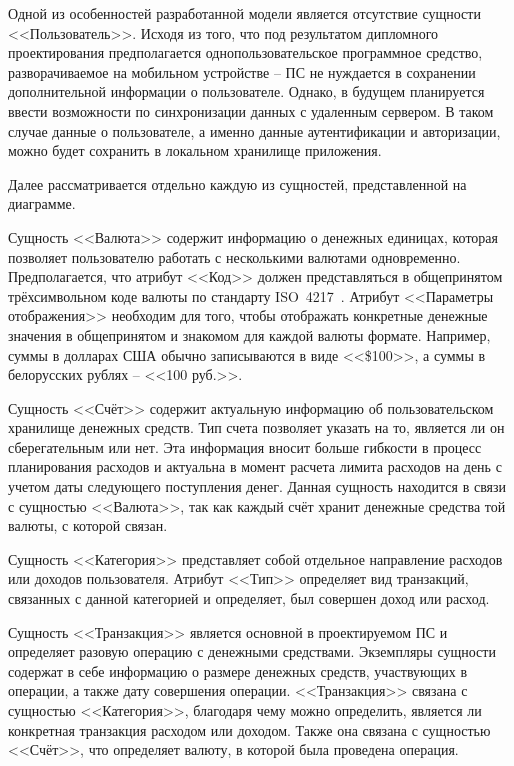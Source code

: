 Одной из особенностей разработанной модели является отсутствие сущности <<Пользователь>>.
Исходя из того, что под результатом дипломного проектирования предполагается однопользовательское программное средство, разворачиваемое на мобильном устройстве -- ПС не нуждается в сохранении дополнительной информации о пользователе.
Однако, в будущем планируется ввести возможности по синхронизации данных с удаленным сервером.
В таком случае данные о пользователе, а именно данные аутентификации и авторизации, можно будет сохранить в локальном хранилище приложения.

Далее рассматривается отдельно каждую из сущностей, представленной на диаграмме.

Сущность <<Валюта>> содержит информацию о денежных единицах, которая позволяет пользователю работать с несколькими валютами одновременно.
Предполагается, что атрибут <<Код>> должен представляться в общепринятом трёхсимвольном коде валюты по стандарту ISO~4217~\cite{iso_4217}.
Атрибут <<Параметры отображения>> необходим для того, чтобы отображать конкретные денежные значения в общепринятом и знакомом для каждой валюты формате. Например, суммы в долларах США обычно записываются в виде <<\$100>>, а суммы в белорусских рублях -- <<100 руб.>>.

Сущность <<Счёт>> содержит актуальную информацию об пользовательском хранилище денежных средств.
Тип счета позволяет указать на то, является ли он сберегательным или нет.
Эта информация вносит больше гибкости в процесс планирования расходов и актуальна в момент расчета лимита расходов на день с учетом даты следующего поступления денег.
Данная сущность находится в связи с сущностью <<Валюта>>, так как каждый счёт хранит денежные средства той валюты, с которой связан.

Сущность <<Категория>> представляет собой отдельное направление расходов или доходов пользователя.
Атрибут <<Тип>> определяет вид транзакций, связанных с данной категорией и определяет, был совершен доход или расход.

Сущность <<Транзакция>> является основной в проектируемом ПС и определяет разовую операцию с денежными средствами.
Экземпляры сущности содержат в себе информацию о размере денежных средств, участвующих в операции, а также дату совершения операции.
<<Транзакция>> связана с сущностью <<Категория>>, благодаря чему можно определить, является ли конкретная транзакция расходом или доходом.
Также она связана с сущностью <<Счёт>>, что определяет валюту, в которой была проведена операция.

